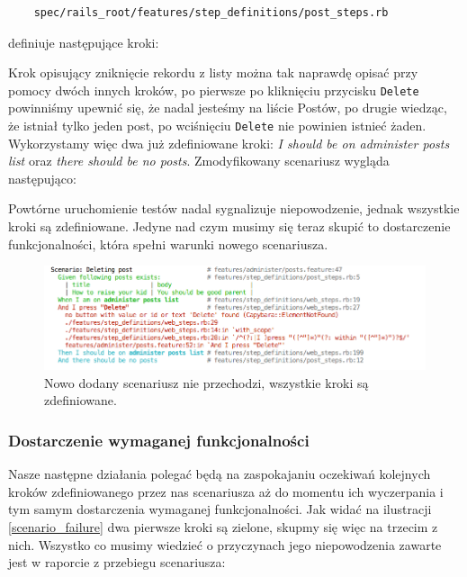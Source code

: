     \begin{lstlisting}
    spec/rails_root/features/step_definitions/post_steps.rb
    \end{lstlisting}
    
    definiuje następujące kroki:
    
    
    
    Krok opisujący zniknięcie rekordu z listy można tak naprawdę opisać przy pomocy dwóch innych kroków, po pierwsze po kliknięciu przycisku \texttt{Delete} powinniśmy upewnić się, że nadal jesteśmy na liście Postów, po drugie wiedząc, że istniał tylko jeden post, po wciśnięciu \texttt{Delete} nie powinien istnieć żaden. Wykorzystamy więc dwa już zdefiniowane kroki: \emph{I should be on administer posts list} oraz \emph{there should be no posts}. Zmodyfikowany scenariusz wygląda następująco:
    
    
    
    Powtórne uruchomienie testów nadal sygnalizuje niepowodzenie, jednak wszystkie kroki są zdefiniowane. Jedyne nad czym musimy się teraz skupić to dostarczenie funkcjonalności, która spełni warunki nowego scenariusza.
     
     \clearpage
     
     \begin{figure}[!h]
   		\begin{center}
   			\includegraphics[width=\linewidth]{images/scenario_failure_2.png}
   			\caption{Nowo dodany scenariusz nie przechodzi, wszystkie kroki są zdefiniowane.}
   			\label{scenario_failure_2}
   		\end{center}
   	\end{figure}
   	
   \subsubsection{Dostarczenie wymaganej funkcjonalności}
   
   Nasze następne działania polegać będą na zaspokajaniu oczekiwań kolejnych kroków zdefiniowanego przez nas scenariusza aż do momentu ich wyczerpania i tym samym dostarczenia wymaganej funkcjonalności. Jak widać na ilustracji \ref{scenario_failure} dwa pierwsze kroki są zielone, skupmy się więc na trzecim z nich. Wszystko co musimy wiedzieć o przyczynach jego niepowodzenia zawarte jest w raporcie z przebiegu scenariusza:
   
